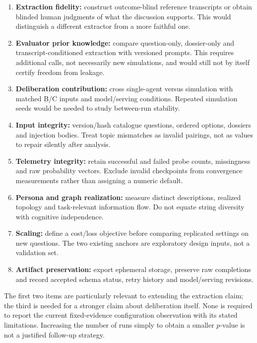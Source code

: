 \begin{enumerate}
\item \textbf{Extraction fidelity:} construct outcome-blind reference transcripts or obtain blinded human judgments of what the discussion supports. This would distinguish a different extractor from a more faithful one.
\item \textbf{Evaluator prior knowledge:} compare question-only, dossier-only and transcript-conditioned extraction with versioned prompts. This requires additional calls, not necessarily new simulations, and would still not by itself certify freedom from leakage.
\item \textbf{Deliberation contribution:} cross single-agent versus simulation with matched B/C inputs and model/serving conditions. Repeated simulation seeds would be needed to study between-run stability.
\item \textbf{Input integrity:} version/hash catalogue questions, ordered options, dossiers and injection bodies. Treat topic mismatches as invalid pairings, not as values to repair silently after analysis.
\item \textbf{Telemetry integrity:} retain successful and failed probe counts, missingness and raw probability vectors. Exclude invalid checkpoints from convergence measurements rather than assigning a numeric default.
\item \textbf{Persona and graph realization:} measure distinct descriptions, realized topology and task-relevant information flow. Do not equate string diversity with cognitive independence.
\item \textbf{Scaling:} define a cost/loss objective before comparing replicated settings on new questions. The two existing anchors are exploratory design inputs, not a validation set.
\item \textbf{Artifact preservation:} export ephemeral storage, preserve raw completions and record accepted schema status, retry history and model/serving revisions.
\end{enumerate}

The first two items are particularly relevant to extending the extraction claim; the third is needed for a stronger claim about deliberation itself. None is required to report the current fixed-evidence configuration observation with its stated limitations. Increasing the number of runs simply to obtain a smaller $p$-value is not a justified follow-up strategy.
